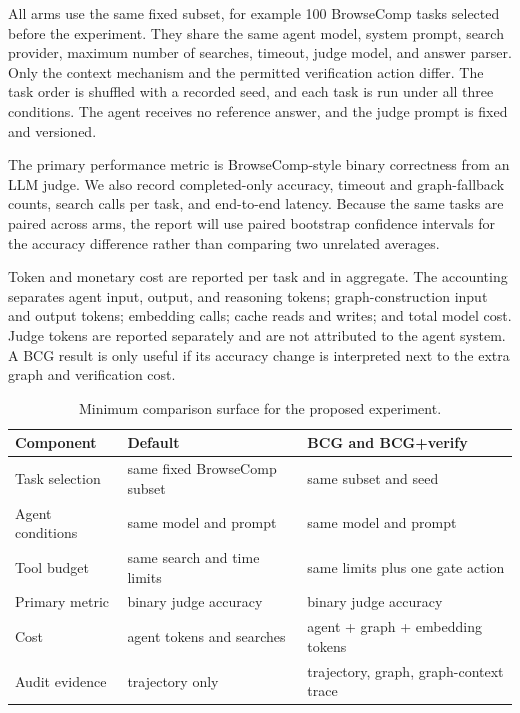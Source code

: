 \documentclass{article}
\begin{document}
All arms use the same fixed subset, for example 100 BrowseComp tasks selected
before the experiment. They share the same agent model, system prompt, search
provider, maximum number of searches, timeout, judge model, and answer parser.
Only the context mechanism and the permitted verification action differ. The
task order is shuffled with a recorded seed, and each task is run under all
three conditions. The agent receives no reference answer, and the judge prompt
is fixed and versioned.

The primary performance metric is BrowseComp-style binary correctness from an
LLM judge. We also record completed-only accuracy, timeout and graph-fallback
counts, search calls per task, and end-to-end latency. Because the same tasks
are paired across arms, the report will use paired bootstrap confidence
intervals for the accuracy difference rather than comparing two unrelated
averages.

Token and monetary cost are reported per task and in aggregate. The accounting
separates agent input, output, and reasoning tokens; graph-construction input
and output tokens; embedding calls; cache reads and writes; and total model
cost. Judge tokens are reported separately and are not attributed to the agent
system. A BCG result is only useful if its accuracy change is interpreted next
to the extra graph and verification cost.

\begin{table}[t]
\caption{Minimum comparison surface for the proposed experiment.}
\label{tab:eval}
\centering
\small
\begin{tabularx}{\linewidth}{@{}lXX@{}}
\toprule
Component & Default & BCG and BCG+verify \\
\midrule
Task selection & same fixed BrowseComp subset & same subset and seed \\
Agent conditions & same model and prompt & same model and prompt \\
Tool budget & same search and time limits & same limits plus one gate action \\
Primary metric & binary judge accuracy & binary judge accuracy \\
Cost & agent tokens and searches & agent + graph + embedding tokens \\
Audit evidence & trajectory only & trajectory, graph, graph-context trace \\
\bottomrule
\end{tabularx}
\end{table}
\end{document}
